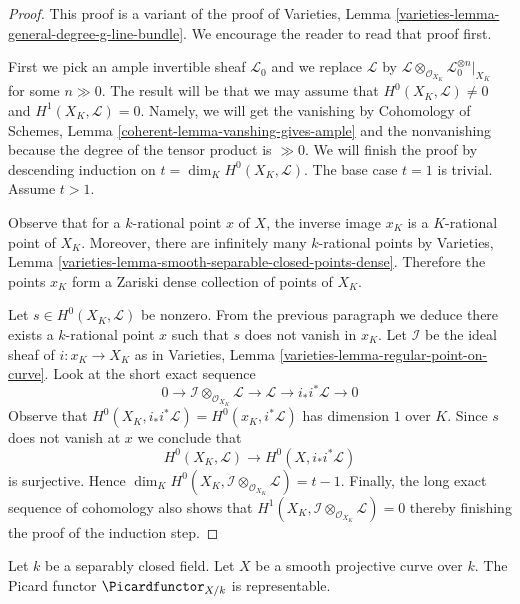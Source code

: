 \begin{proof}
This proof is a variant of the proof of
Varieties, Lemma \ref{varieties-lemma-general-degree-g-line-bundle}.
We encourage the reader to read that proof first.

\medskip\noindent
First we pick an ample invertible sheaf $\mathcal{L}_0$ and
we replace $\mathcal{L}$ by
$\mathcal{L} \otimes_{\mathcal{O}_{X_K}} \mathcal{L}_0^{\otimes n}|_{X_K}$
for some $n \gg 0$. The result will be that we may assume that
$H^0(X_K, \mathcal{L}) \not = 0$ and $H^1(X_K, \mathcal{L}) = 0$.
Namely, we will get the vanishing by Cohomology of Schemes, Lemma
\ref{coherent-lemma-vanshing-gives-ample} and the nonvanishing because
the degree of the tensor product is $\gg 0$.
We will finish the proof by descending induction on
$t = \dim_K H^0(X_K, \mathcal{L})$. The base case $t = 1$ is trivial.
Assume $t > 1$.

\medskip\noindent
Observe that for a $k$-rational point $x$ of $X$, the inverse image $x_K$
is a $K$-rational point of $X_K$. Moreover, there are infinitely many
$k$-rational points by Varieties, Lemma
\ref{varieties-lemma-smooth-separable-closed-points-dense}. Therefore
the points $x_K$ form a Zariski dense collection of points of $X_K$.

\medskip\noindent
Let $s \in H^0(X_K, \mathcal{L})$ be nonzero. From the previous paragraph
we deduce there exists a $k$-rational
point $x$ such that $s$ does not vanish in $x_K$. Let $\mathcal{I}$
be the ideal sheaf of $i : x_K \to X_K$ as in
Varieties, Lemma \ref{varieties-lemma-regular-point-on-curve}. Look at the
short exact sequence
$$
0 \to \mathcal{I} \otimes_{\mathcal{O}_{X_K}} \mathcal{L} \to
\mathcal{L} \to i_*i^*\mathcal{L} \to 0
$$
Observe that $H^0(X_K, i_*i^*\mathcal{L}) = H^0(x_K, i^*\mathcal{L})$
has dimension $1$ over $K$. Since $s$ does not vanish at $x$ we conclude that
$$
H^0(X_K, \mathcal{L}) \longrightarrow H^0(X, i_*i^*\mathcal{L})
$$
is surjective. Hence
$\dim_K H^0(X_K, \mathcal{I} \otimes_{\mathcal{O}_{X_K}} \mathcal{L}) = t - 1$.
Finally, the long exact sequence of cohomology also shows that
$H^1(X_K, \mathcal{I} \otimes_{\mathcal{O}_{X_K}} \mathcal{L}) = 0$
thereby finishing the proof of the induction step.
\end{proof}

\begin{proposition}
\label{proposition-pic-curve}
Let $k$ be a separably closed field. Let $X$ be a smooth projective
curve over $k$. The Picard functor $\Picardfunctor_{X/k}$ is representable.
\end{proposition}

